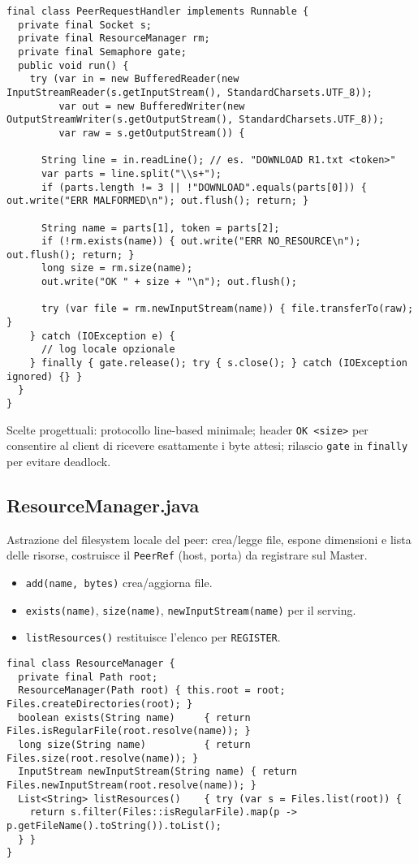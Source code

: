 \documentclass[a4paper,12pt]{article}
\begin{document}
\begin{lstlisting}
final class PeerRequestHandler implements Runnable {
  private final Socket s;
  private final ResourceManager rm;
  private final Semaphore gate;
  public void run() {
    try (var in = new BufferedReader(new InputStreamReader(s.getInputStream(), StandardCharsets.UTF_8));
         var out = new BufferedWriter(new OutputStreamWriter(s.getOutputStream(), StandardCharsets.UTF_8));
         var raw = s.getOutputStream()) {

      String line = in.readLine(); // es. "DOWNLOAD R1.txt <token>"
      var parts = line.split("\\s+");
      if (parts.length != 3 || !"DOWNLOAD".equals(parts[0])) { out.write("ERR MALFORMED\n"); out.flush(); return; }

      String name = parts[1], token = parts[2];
      if (!rm.exists(name)) { out.write("ERR NO_RESOURCE\n"); out.flush(); return; }
      long size = rm.size(name);
      out.write("OK " + size + "\n"); out.flush();

      try (var file = rm.newInputStream(name)) { file.transferTo(raw); }
    } catch (IOException e) {
      // log locale opzionale
    } finally { gate.release(); try { s.close(); } catch (IOException ignored) {} }
  }
}
\end{lstlisting}

Scelte progettuali: protocollo line-based minimale; header \texttt{OK <size>} per consentire al client di ricevere esattamente i byte attesi; rilascio \texttt{gate} in \texttt{finally} per evitare deadlock.

\subsection*{ResourceManager.java}
Astrazione del filesystem locale del peer: crea/legge file, espone dimensioni e lista delle risorse, costruisce il \texttt{PeerRef} (host, porta) da registrare sul Master.
\begin{itemize}[nosep]
  \item \texttt{add(name, bytes)} crea/aggiorna file.
  \item \texttt{exists(name)}, \texttt{size(name)}, \texttt{newInputStream(name)} per il serving.
  \item \texttt{listResources()} restituisce l’elenco per \texttt{REGISTER}.
\end{itemize}

\begin{lstlisting}
final class ResourceManager {
  private final Path root;
  ResourceManager(Path root) { this.root = root; Files.createDirectories(root); }
  boolean exists(String name)     { return Files.isRegularFile(root.resolve(name)); }
  long size(String name)          { return Files.size(root.resolve(name)); }
  InputStream newInputStream(String name) { return Files.newInputStream(root.resolve(name)); }
  List<String> listResources()    { try (var s = Files.list(root)) {
    return s.filter(Files::isRegularFile).map(p -> p.getFileName().toString()).toList();
  } }
}
\end{lstlisting}
\end{document}
